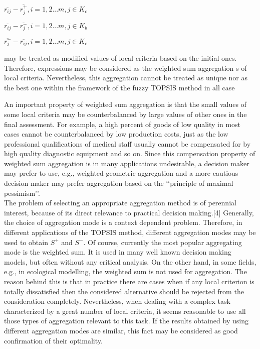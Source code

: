\documentclass[12pt,a4paper]{article}
\begin{document}
\begin{enumerate}
\begin{enumerate}
\begin{center}
$\overline{r_{ij}} - \overline{r_{j}^{+}} , i=1,2...m , j \in K_{c}$

$\overline{r_{ij}} - \overline{r_{j}^{-}} , i=1,2...m , j \in K_{b}$

$\overline{r_{j}^{-}} - \overline{r_{ij}} , i=1,2...m , j \in K_{c}$
    
\end{center}

may be treated as modified values of local criteria based on the initial ones. Therefore, expressions may be considered as the weighted sum aggregation s of local criteria. Nevertheless, this aggregation cannot be treated as unique nor as the best one within the framework of the fuzzy TOPSIS method in all case 
\end{enumerate}

\end{enumerate}

An important property of weighted sum aggregation is that the small values of some local criteria may be counterbalanced by large values of other ones in the final assessment. For example, a high percent of goods of low quality in most cases cannot be counterbalanced by low production costs, just as the low professional qualifications of medical staff usually cannot be compensated for by high quality diagnostic equipment and so on. Since this compensation property of weighted sum aggregation is in many applications undesirable, a decision maker may prefer to use, e.g., weighted geometric aggregation and a more cautious decision maker may prefer aggregation based on the ‘‘principle of maximal pessimism’’. \\

The problem of selecting an appropriate aggregation method is of perennial interest, because of its direct relevance to practical decision making.[4] Generally, the choice of aggregation mode is a context dependent problem. Therefore, in different applications of the TOPSIS method, different aggregation modes may be used to obtain $S^{+}$ and $S^{-}$. Of course, currently the most popular aggregating mode is the weighted sum. It is used in many well known decision making models, but often without any critical analysis. On the other hand, in some fields, e.g., in ecological modelling, the weighted sum is not used for aggregation. The reason behind this is that in practice there are cases when if any local criterion is totally dissatisfied then the considered alternative should be rejected from the consideration completely. Nevertheless, when dealing with a complex task characterized by a great number of local criteria, it seems reasonable to use all those types of aggregation relevant to this task. If the results obtained by using different aggregation modes are similar, this fact may be considered as good confirmation of their optimality.\\
\end{document}
